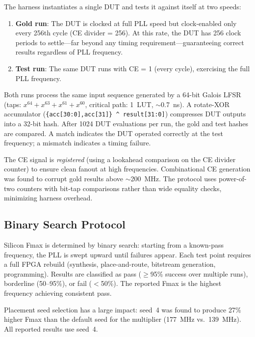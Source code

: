 \documentclass[10pt,twocolumn]{article}
\begin{document}
The harness instantiates a single DUT and tests it against itself at
two speeds:

\begin{enumerate}
  \item \textbf{Gold run}: The DUT is clocked at full PLL speed but
        clock-enabled only every 256th cycle (CE divider = 256).
        At this rate, the DUT has 256 clock periods to settle---far
        beyond any timing requirement---guaranteeing correct results
        regardless of PLL frequency.
  \item \textbf{Test run}: The same DUT runs with CE = 1 (every cycle),
        exercising the full PLL frequency.
\end{enumerate}

Both runs process the same input sequence generated by a 64-bit Galois
LFSR (taps: $x^{64} + x^{63} + x^{61} + x^{60}$, critical path:
1~LUT, $\sim$0.7~ns).  A rotate-XOR accumulator
(\texttt{\{acc[30:0],acc[31]\} \^{} result[31:0]}) compresses DUT
outputs into a 32-bit hash.  After 1024 DUT evaluations per run, the
gold and test hashes are compared.  A match indicates the DUT operated
correctly at the test frequency; a mismatch indicates a timing failure.

The CE signal is \emph{registered} (using a lookahead comparison on
the CE divider counter) to ensure clean fanout at high frequencies.
Combinational CE generation was found to corrupt gold results above
$\sim$200~MHz.  The protocol uses power-of-two counters with bit-tap
comparisons rather than wide equality checks, minimizing harness
overhead.

\subsection{Binary Search Protocol}

Silicon Fmax is determined by binary search: starting from a known-pass
frequency, the PLL is swept upward until failures appear.  Each test
point requires a full FPGA rebuild (synthesis, place-and-route, bitstream
generation, programming).  Results are classified as pass ($\geq$95\%
success over multiple runs), borderline (50--95\%), or fail ($<$50\%).
The reported Fmax is the highest frequency achieving consistent pass.

Placement seed selection has a large impact: seed~4 was found to
produce 27\% higher Fmax than the default seed for the multiplier
(177~MHz vs.\ 139~MHz).  All reported results use seed~4.
\end{document}
